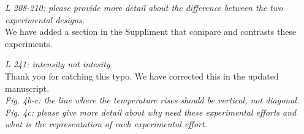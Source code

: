 \documentclass[11pt]{article}
\begin{document}
\emph{L 208-210: please provide more detail about the difference between the two experimental designs.}\\
We have added a section in the Suppliment that compare and contrasts these experiments.

\emph{L 241: intensity not intesity}\\
Thank you for catching this typo. We have corrected this in the updated manuscript.\\

\emph{Fig. 4b-c: the line where the temperature rises should be vertical, not diagonal.}\\

\emph{Fig. 4c: please give more detail about why need these experimental efforts and what is the representation of each experimental effort.}\\
 
\end{document}
